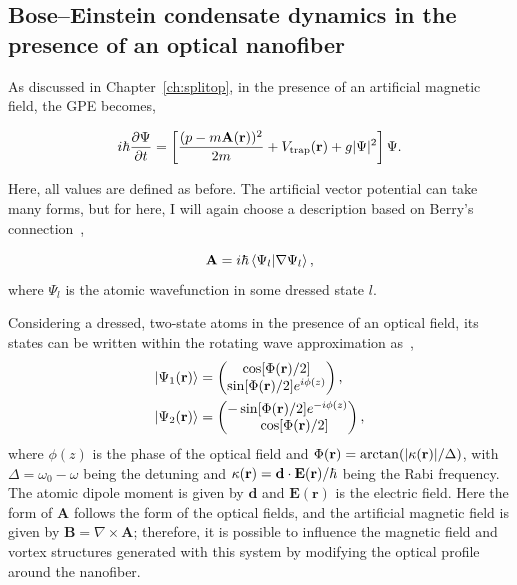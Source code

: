 \subsection{Bose--Einstein condensate dynamics in the presence of an optical nanofiber}

As discussed in Chapter~\ref{ch:splitop}, in the presence of an artificial magnetic field, the GPE becomes,

\begin{equation}
i\hbar \frac{\partial \Psi}{\partial t} = \left[\frac{(p-m\mathbf{A}({\bf r}))^2}{2m} + V_{\text{trap}}({\bf r}) + g|\Psi|^2 \right] \Psi.
\end{equation}

\noindent Here, all values are defined as before.
The artificial vector potential can take many forms, but for here, I will again choose a description based on Berry's connection~\cite{dalibard2011},

\begin{equation}
  \mathbf{A} = i\hbar \braket{\Psi_l | \nabla \Psi_l},
\end{equation}
\noindent where $\Psi_l$ is the atomic wavefunction in some dressed state $l$.

Considering a dressed, two-state atoms in the presence of an optical field, its states can be written within the rotating wave approximation as~\cite{mochol2015},
\begin{align}
\ket{\Psi_1({\bf r})} &= 
\begin{pmatrix}
    \cos[\Phi({\bf r})/2] \\
     \sin[\Phi({\bf r}) /2]e^{i\phi(z)} 
\end{pmatrix},\\
\ket{\Psi_2({\bf r})} &= 
\begin{pmatrix}
    -\sin[\Phi({\bf r}) /2]e^{-i\phi(z)} \\
    \quad\cos[\Phi({\bf r})/2]
\end{pmatrix},
\end{align}
\noindent where $\phi(z)$ is the phase of the optical field and $\Phi({\bf r}) = \arctan(|\kappa({\bf r})|/\Delta)$, with $\Delta = \omega_0 - \omega$ being the detuning and $\kappa({\bf r}) = \mathbf{d} \cdot \mathbf{E}({\bf r}) / \hbar$ being the Rabi frequency.
The atomic dipole moment is given by $\mathbf{d}$ and $\mathbf{E(\mathbf{r})}$ is the electric field.
Here the form of $\mathbf{A}$ follows the form of the optical fields, and the artificial magnetic field is given by $\mathbf{B}= \nabla \times \mathbf{A}$; therefore, it is possible to influence the magnetic field and vortex structures generated with this system by modifying the optical profile around the nanofiber.

